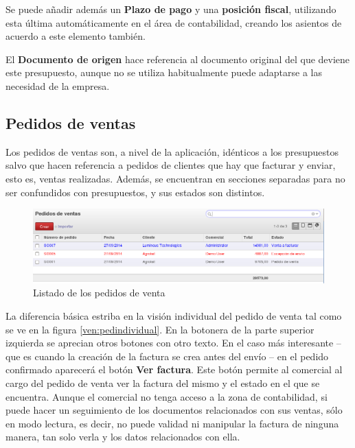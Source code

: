 Se puede añadir además un \textbf{Plazo de pago} y una \textbf{posición fiscal}, utilizando esta última automáticamente en el área de 
contabilidad, creando los asientos de acuerdo a este elemento también.

El \textbf{Documento de origen} hace referencia al documento original del que deviene este presupuesto, aunque no se utiliza habitualmente puede adaptarse a las necesidad de la empresa.


\subsection{Pedidos de ventas}
\label{pedidosventas}

Los pedidos de ventas son, a nivel de la aplicación, idénticos a los presupuestos salvo que hacen referencia a pedidos de clientes que hay que facturar y enviar, esto es, ventas realizadas. Además, se encuentran en secciones separadas para no ser confundidos con presupuestos, y sus estados son distintos.

\begin{figure}[H]
\includegraphics[width=\textwidth]{ventas/img/ven_pedlistado.png}
\caption{Listado de los pedidos de venta}
\label{ven:pedlistado}
\end{figure}

La diferencia básica estriba en la visión individual del pedido de venta tal como se ve en la figura \ref{ven:pedindividual}. En la botonera de la parte superior izquierda se aprecian otros botones con otro texto. En el caso más interesante -- que es cuando la creación de la factura se crea antes del envío -- en el pedido confirmado aparecerá el botón \textbf{Ver factura}. Este botón permite al comercial al cargo del pedido de venta ver la factura del mismo y el estado en el que se encuentra. Aunque el comercial no tenga acceso a la zona de contabilidad, si puede hacer un seguimiento de los documentos relacionados con sus ventas, sólo en modo lectura, es decir, no puede validad ni manipular la factura de ninguna manera, tan solo verla y los datos relacionados con ella.

